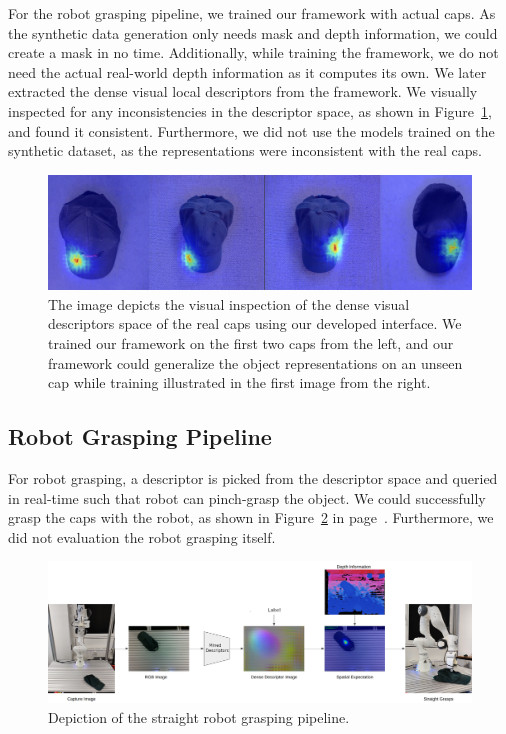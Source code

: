 For the robot grasping pipeline, we trained our framework with actual caps.
As the synthetic data generation only needs mask and depth information, we could create a mask in no time.
Additionally, while training the framework, we do not need the actual real-world depth information as it computes its own.
We later extracted the dense visual local descriptors from the framework.
We visually inspected for any inconsistencies in the descriptor space, as shown in Figure~\ref{fig:check_real_caps},
and found it consistent. Furthermore, we did not use the models trained on the synthetic dataset, as the representations were inconsistent with the real caps.

\begin{figure}[htb]
    \centering
    \includegraphics[scale=0.29]{images/test_real_caps.png}
    \caption{The image depicts the visual inspection of the dense visual descriptors space of the real caps using our developed interface. We trained our framework on the first two caps from the left, and our framework could generalize the object representations on an unseen cap while training illustrated in the first image from the right.}
    \label{fig:check_real_caps}
\end{figure}



\subsection{Robot Grasping Pipeline}

For robot grasping, a descriptor is picked from the descriptor space and queried in real-time such that robot can pinch-grasp the object.
We could successfully grasp the caps with the robot, as shown in Figure~\ref{fig:straight_grasp} in page~\pageref{fig:straight_grasp}.
Furthermore, we did not evaluation the robot grasping itself.

\begin{figure}[htb]
    \centering
    \includegraphics[scale=0.15]{images/straight_grasps.png}
    \caption{Depiction of the straight robot grasping pipeline.}
    \label{fig:straight_grasp}
\end{figure}

